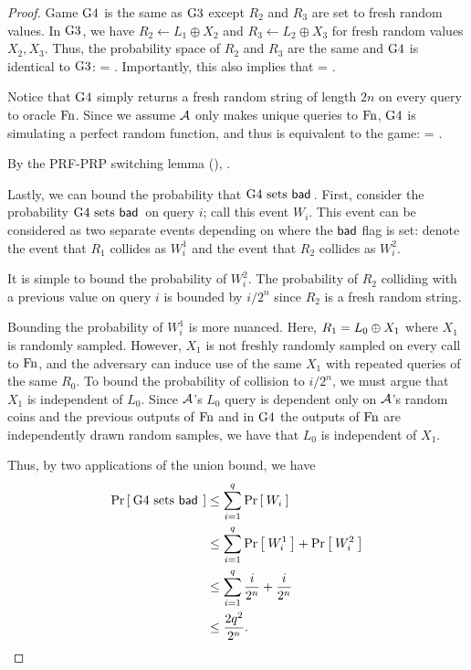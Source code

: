 \begin{proof}
Game ${{\textnormal G}}4$ is the same as ${{\textnormal G}}3$ except $R_2$ and $R_3$ are set to fresh random values.
In ${{\textnormal G}}3$, we have $R_2\gets L_1\oplus X_2$ and $R_3\gets L_2\oplus X_3$ for fresh random values $X_2,X_3$.
Thus, the probability space of $R_2$ and $R_3$ are the same and ${{\textnormal G}}4$ is identical to ${{\textnormal G}}3$:
\bnm
{} = .
\enm
Importantly, this also implies that
\bnm
{} = .
\enm

Notice that ${{\textnormal G}}4$ simply returns a fresh random string of length $2n$ on every query to oracle $\textnormal{Fn}$.
Since we assume ${\mathcal A}$ only makes unique queries to $\textnormal{Fn}$, ${{\textnormal G}}4$ is simulating a perfect random function, and thus is equivalent to the  game:
\bnm
{} = .
\enm

By the PRF-PRP switching lemma (),
	\bnm
	 \le {}  \;.
	\enm

Lastly, we can bound the probability that ${{\textnormal G}}4\mbox{~\textup{sets} $\mathsf{bad}$}\,$.
First, consider the probability ${{\textnormal G}}4\mbox{~\textup{sets} $\mathsf{bad}$}\,$ on query $i$; call this event $W_i$.
This event can be considered as two separate events depending on where the $\mathsf{bad}$ flag is set:
denote the event that $R_1$ collides as $W_i^1$ and the event that $R_2$ collides as $W_i^2$.

It is simple to bound the probability of $W_i^2$.
The probability of $R_2$ colliding with a previous value on query $i$ is bounded by $i/2^n$ since $R_2$ is a fresh random string.

Bounding the probability of $W_i^1$ is more nuanced.
Here, $R_1 = L_0{\:\oplus\:} X_1$ where $X_1$ is randomly sampled.
However, $X_1$ is not freshly randomly sampled on every call to $\textnormal{Fn}$, and the adversary can induce use of the same $X_1$ with repeated queries of the same $R_0$.
To bound the probability of collision to $i/2^n$, we must argue that $X_1$ is independent of $L_0$.
Since ${\mathcal A}$'s $L_0$ query is dependent only on ${\mathcal A}$'s random coins and the previous outputs of $\textnormal{Fn}$ and in ${{\textnormal G}}4$ the outputs of $\textnormal{Fn}$ are independently drawn random samples, we have that $L_0$ is independent of $X_1$.

Thus, by two applications of the union bound, we have
\begin{align*}
  \Pr\left[\: {{\textnormal G}}4 \mbox{~\textup{sets} $\mathsf{bad}$}\, \:\right] &\le \sum_{i=1}^q \Pr\left[\: W_i \:\right]\\
  &\le \sum_{i=1}^q \Pr\left[\: W_i^1 \:\right] + \Pr\left[\: W_i^2 \:\right]\\
  &\le \sum_{i=1}^q \frac{i}{2^n} + \frac{i}{2^n}\\
  &\le \frac{2q^2}{2^n}.
\end{align*}


\end{proof}
